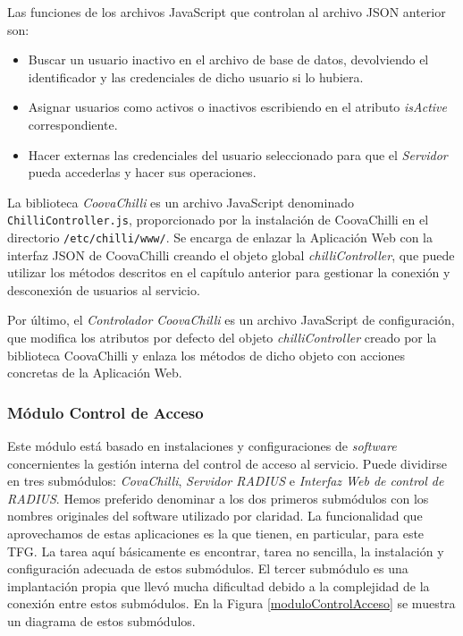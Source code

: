 Las funciones de los archivos JavaScript que controlan al archivo JSON anterior son:

\begin{itemize}
\item Buscar un usuario inactivo en el archivo de base de datos, devolviendo el identificador y las credenciales de dicho usuario si lo hubiera.
\item Asignar usuarios como activos o inactivos escribiendo en el atributo \emph{isActive} correspondiente.
\item Hacer externas las credenciales del usuario seleccionado para que el \emph{Servidor} pueda accederlas y hacer sus operaciones.
\end{itemize}

La biblioteca \emph{CoovaChilli} es un archivo JavaScript denominado \verb+ChilliController.js+, proporcionado por la instalación de CoovaChilli en el directorio \verb+/etc/chilli/www/+. Se encarga de enlazar la Aplicación Web con la interfaz JSON de CoovaChilli creando el objeto global \emph{chilliController}, que puede utilizar los métodos descritos en el capítulo anterior para gestionar la conexión y desconexión de usuarios al servicio.

Por último, el \emph{Controlador CoovaChilli} es un archivo JavaScript de configuración, que modifica los atributos por defecto del objeto \emph{chilliController} creado por la biblioteca CoovaChilli y enlaza los métodos de dicho objeto con acciones concretas de la Aplicación Web.

\subsubsection{Módulo Control de Acceso}
Este módulo está basado en instalaciones y configuraciones de \emph{software} concernientes la gestión interna del control de acceso al servicio. Puede dividirse en tres submódulos: \emph{CovaChilli}, \emph{Servidor RADIUS} e \emph{Interfaz Web de control de RADIUS}. Hemos preferido denominar a los dos primeros submódulos con los nombres originales del software utilizado por claridad. La funcionalidad que aprovechamos de estas aplicaciones es la que tienen, en particular, para este TFG. La tarea aquí básicamente es encontrar, tarea no sencilla, la instalación y configuración adecuada de estos submódulos. El tercer submódulo es una implantación propia que llevó mucha dificultad debido a la complejidad de la conexión entre estos submódulos. En la Figura \ref{moduloControlAcceso} se muestra un diagrama de estos submódulos.

